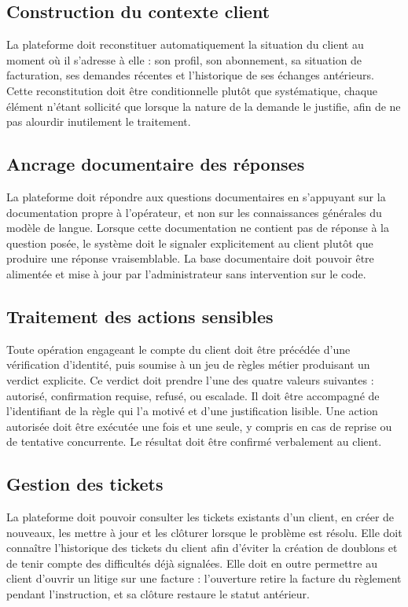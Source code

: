 \subsection{Construction du contexte client}

La plateforme doit reconstituer automatiquement la situation du client au moment où il s'adresse à elle : son profil, son abonnement, sa situation de facturation, ses demandes récentes et l'historique de ses échanges antérieurs. Cette reconstitution doit être conditionnelle plutôt que systématique, chaque élément n'étant sollicité que lorsque la nature de la demande le justifie, afin de ne pas alourdir inutilement le traitement.

\subsection{Ancrage documentaire des réponses}

La plateforme doit répondre aux questions documentaires en s'appuyant sur la documentation propre à l'opérateur, et non sur les connaissances générales du modèle de langue. Lorsque cette documentation ne contient pas de réponse à la question posée, le système doit le signaler explicitement au client plutôt que produire une réponse vraisemblable. La base documentaire doit pouvoir être alimentée et mise à jour par l'administrateur sans intervention sur le code.

\subsection{Traitement des actions sensibles}

Toute opération engageant le compte du client doit être précédée d'une vérification d'identité, puis soumise à un jeu de règles métier produisant un verdict explicite. Ce verdict doit prendre l'une des quatre valeurs suivantes : autorisé, confirmation requise, refusé, ou escalade. Il doit être accompagné de l'identifiant de la règle qui l'a motivé et d'une justification lisible. Une action autorisée doit être exécutée une fois et une seule, y compris en cas de reprise ou de tentative concurrente. Le résultat doit être confirmé verbalement au client.

\subsection{Gestion des tickets}

La plateforme doit pouvoir consulter les tickets existants d'un client, en créer de nouveaux, les mettre à jour et les clôturer lorsque le problème est résolu. Elle doit connaître l'historique des tickets du client afin d'éviter la création de doublons et de tenir compte des difficultés déjà signalées. Elle doit en outre permettre au client d'ouvrir un litige sur une facture : l'ouverture retire la facture du règlement pendant l'instruction, et sa clôture restaure le statut antérieur.

